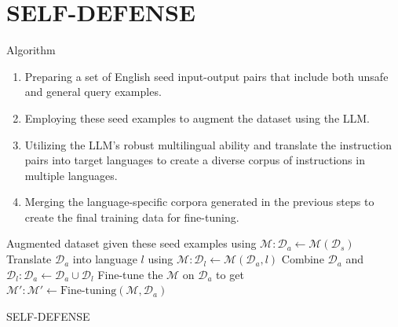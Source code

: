 \section{SELF-DEFENSE}

\begin{frame}{Algorithm}
    \begin{enumerate}
        \item Preparing a set of English seed input-output pairs that include both unsafe and general query examples.
        \item Employing these seed examples to augment the dataset using the LLM. 
        \item Utilizing the LLM’s robust multilingual ability and translate the instruction pairs into target languages to create a diverse corpus of instructions in multiple languages.
        \item Merging the language-specific corpora generated in the previous steps to create the final training data for fine-tuning.
    \end{enumerate}
    
    \begin{algorithm}[H]
        \begin{algorithmic}[1]
            \STATE Augmented dataset given these seed examples using $\mathcal{M}: \mathcal{D}_a \leftarrow \mathcal{M}(\mathcal{D}_s)$
                \STATE Translate $\mathcal{D}_a$ into language $l$ using $\mathcal{M}: \mathcal{D}_l \leftarrow \mathcal{M}(\mathcal{D}_a, l)$ 
                \STATE Combine $\mathcal{D}_a$ and $\mathcal{D}_l: \mathcal{D}_a \leftarrow \mathcal{D}_a \cup \mathcal{D}_l$
            \ENDFOR
            \STATE Fine-tune the $\mathcal{M}$ on $\mathcal{D}_a$ to get $\mathcal{M}' : \mathcal{M}' \leftarrow \text{Fine-tuning}(\mathcal{M}, \mathcal{D}_a)$
        \end{algorithmic}
    \caption{SELF-DEFENSE}
    \label{alg:self_defence}
    \end{algorithm}
\end{frame}


